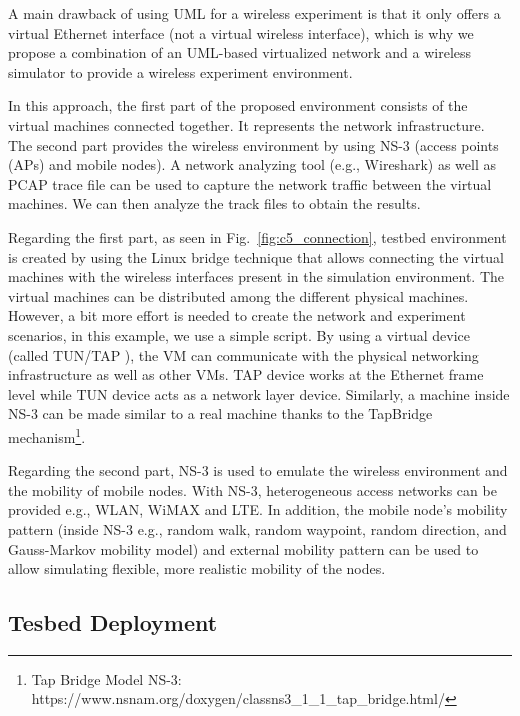 A main drawback of using UML for a wireless experiment is that it only offers a virtual Ethernet interface (not a virtual wireless interface), which is why we propose a combination of an UML-based virtualized network and a wireless simulator to provide a wireless experiment environment.

In this approach, the first part of the proposed environment consists of the virtual machines connected together. It represents the network infrastructure. The second part provides the wireless environment by using NS-3 (access points (APs) and mobile nodes). A network analyzing tool (e.g., Wireshark) as well as PCAP trace file can be used to capture the network traffic between the virtual machines. We can then analyze the track files to obtain the results.

Regarding the first part, as seen in Fig.~\ref{fig:c5_connection}, testbed environment is created by using the Linux bridge technique that allows connecting the virtual machines with the wireless interfaces present in the simulation environment. The virtual machines can be distributed among the different physical machines. However, a bit more effort is needed to create the network and experiment scenarios, in this example, we use a simple script. By using a virtual device (called TUN/TAP \cite{tun_tap}), the VM can communicate with the physical networking infrastructure as well as other VMs. TAP device works at the Ethernet frame level while TUN device acts as a network layer device. Similarly, a machine inside NS-3 can be made similar to a real machine thanks to the TapBridge mechanism\footnote{Tap Bridge Model NS-3: https://www.nsnam.org/doxygen/classns3\_1\_1\_tap\_bridge.html/}. 

Regarding the second part, NS-3 is used to emulate the wireless environment and the mobility of mobile nodes. With NS-3, heterogeneous access networks can be provided e.g., WLAN, WiMAX and LTE. In addition, the mobile node's mobility pattern (inside NS-3 e.g., random walk, random waypoint, random direction, and Gauss-Markov mobility model) and external mobility pattern can be used to allow simulating flexible, more realistic mobility of the nodes. 

\subsection{Tesbed Deployment}

